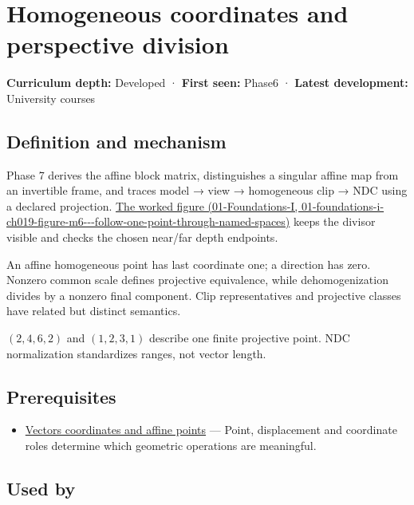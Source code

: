 \hypertarget{appendix-cb3b26862282}{}
\section{Homogeneous coordinates and perspective division}\label{appendix-cb3b26862282-homogeneous-coordinates-and-perspective-division}

\textbf{Curriculum depth:} Developed · \textbf{First seen:} Phase6 · \textbf{Latest development:} University courses

\subsection{Definition and mechanism}\label{appendix-cb3b26862282-definition-and-mechanism}

Phase 7 derives the affine block matrix, distinguishes a singular affine map from an invertible frame, and traces model → view → homogeneous clip → NDC using a declared projection. \href{../01-Foundations-I/main.pdf\#nameddest=01-foundations-i-ch019-figure-m6---follow-one-point-through-named-spaces}{The worked figure (01-Foundations-I, 01-foundations-i-ch019-figure-m6-\/-\/-follow-one-point-through-named-spaces)} keeps the divisor visible and checks the chosen near/far depth endpoints.

An affine homogeneous point has last coordinate one; a direction has zero. Nonzero common scale defines projective equivalence, while dehomogenization divides by a nonzero final component. Clip representatives and projective classes have related but distinct semantics.

\((2,4,6,2)\) and \((1,2,3,1)\) describe one finite projective point. NDC normalization standardizes ranges, not vector length.

\subsection{Prerequisites}\label{appendix-cb3b26862282-prerequisites}

\begin{itemize}
\tightlist
\item
  \hyperref[appendix-0659864c0aa3]{Vectors coordinates and affine points} --- Point, displacement and coordinate roles determine which geometric operations are meaningful.
\end{itemize}

\subsection{Used by}\label{appendix-cb3b26862282-used-by}

